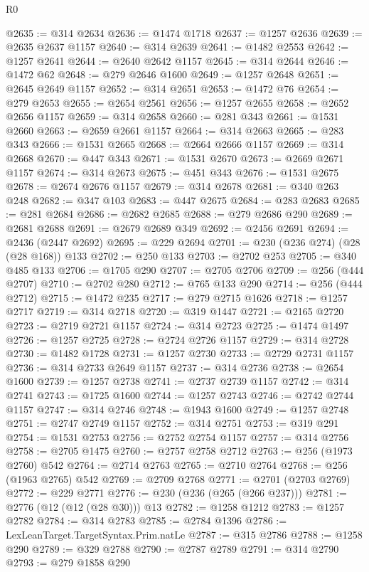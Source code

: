 \begin{lexlean}{R0}
\begin{coremodule}
@2635 := @314 @2634
@2636 := @1474 @1718
@2637 := @1257 @2636
@2639 := @2635 @2637 @1157
@2640 := @314 @2639
@2641 := @1482 @2553
@2642 := @1257 @2641
@2644 := @2640 @2642 @1157
@2645 := @314 @2644
@2646 := @1472 @62
@2648 := @279 @2646 @1600
@2649 := @1257 @2648
@2651 := @2645 @2649 @1157
@2652 := @314 @2651
@2653 := @1472 @76
@2654 := @279 @2653
@2655 := @2654 @2561
@2656 := @1257 @2655
@2658 := @2652 @2656 @1157
@2659 := @314 @2658
@2660 := @281 @343
@2661 := @1531 @2660
@2663 := @2659 @2661 @1157
@2664 := @314 @2663
@2665 := @283 @343
@2666 := @1531 @2665
@2668 := @2664 @2666 @1157
@2669 := @314 @2668
@2670 := @447 @343
@2671 := @1531 @2670
@2673 := @2669 @2671 @1157
@2674 := @314 @2673
@2675 := @451 @343
@2676 := @1531 @2675
@2678 := @2674 @2676 @1157
@2679 := @314 @2678
@2681 := @340 @263 @248
@2682 := @347 @103
@2683 := @447 @2675
@2684 := @283 @2683
@2685 := @281 @2684
@2686 := @2682 @2685
@2688 := @279 @2686 @290
@2689 := @2681 @2688
@2691 := @2679 @2689 @349
@2692 := @2456 @2691
@2694 := @2436 (@2447 @2692)
@2695 := @229 @2694
@2701 := @230 (@236 @274) (@28 (@28 @168)) @133
@2702 := @250 @133
@2703 := @2702 @253
@2705 := @340 @485 @133
@2706 := @1705 @290
@2707 := @2705 @2706
@2709 := @256 (@444 @2707)
@2710 := @2702 @280
@2712 := @765 @133 @290
@2714 := @256 (@444 @2712)
@2715 := @1472 @235
@2717 := @279 @2715 @1626
@2718 := @1257 @2717
@2719 := @314 @2718
@2720 := @319 @1447
@2721 := @2165 @2720
@2723 := @2719 @2721 @1157
@2724 := @314 @2723
@2725 := @1474 @1497
@2726 := @1257 @2725
@2728 := @2724 @2726 @1157
@2729 := @314 @2728
@2730 := @1482 @1728
@2731 := @1257 @2730
@2733 := @2729 @2731 @1157
@2736 := @314 @2733 @2649 @1157
@2737 := @314 @2736
@2738 := @2654 @1600
@2739 := @1257 @2738
@2741 := @2737 @2739 @1157
@2742 := @314 @2741
@2743 := @1725 @1600
@2744 := @1257 @2743
@2746 := @2742 @2744 @1157
@2747 := @314 @2746
@2748 := @1943 @1600
@2749 := @1257 @2748
@2751 := @2747 @2749 @1157
@2752 := @314 @2751
@2753 := @319 @291
@2754 := @1531 @2753
@2756 := @2752 @2754 @1157
@2757 := @314 @2756
@2758 := @2705 @1475
@2760 := @2757 @2758 @2712
@2763 := @256 (@1973 @2760) @542
@2764 := @2714 @2763
@2765 := @2710 @2764
@2768 := @256 (@1963 @2765) @542
@2769 := @2709 @2768
@2771 := @2701 (@2703 @2769)
@2772 := @229 @2771
@2776 := @230 (@236 (@265 (@266 @237)))
@2781 := @2776 (@12 (@12 (@28 @30))) @13
@2782 := @1258 @1212
@2783 := @1257 @2782
@2784 := @314 @2783
@2785 := @2784 @1396
@2786 := LexLeanTarget.TargetSyntax.Prim.natLe
@2787 := @315 @2786
@2788 := @1258 @290
@2789 := @329 @2788
@2790 := @2787 @2789
@2791 := @314 @2790
@2793 := @279 @1858 @290

\end{coremodule}
\end{lexlean}
